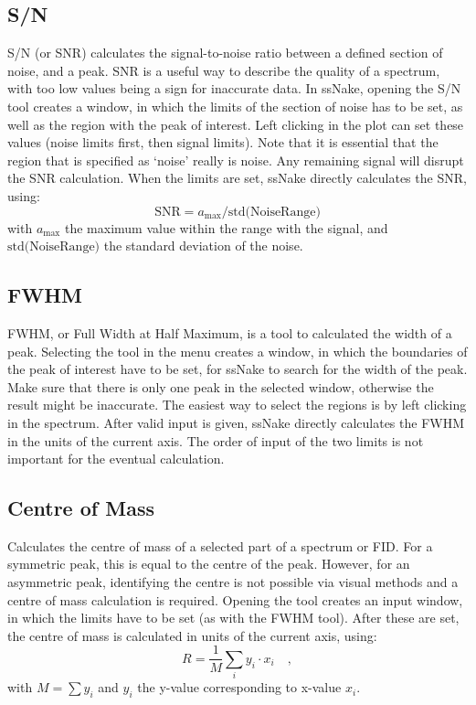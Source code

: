 \documentclass[11pt,a4paper]{article}
\begin{document}
\subsection{S/N}
S/N (or SNR) calculates the signal-to-noise ratio between a defined section of noise, and a peak. SNR is a useful way to describe the quality of a spectrum, with too low values being a sign for inaccurate data. In ssNake, opening the S/N tool creates a window, in which the limits of the section of noise has to be set, as well as the region with the peak of interest. Left clicking in the plot can set these values (noise limits first, then signal limits). Note that it is essential that the region that is specified as `noise' really is noise. Any remaining signal will disrupt the SNR calculation. When the limits are set, ssNake directly calculates the SNR, using:
\begin{equation}
\text{SNR} = a_\text{max} / \text{std(NoiseRange)}
\end{equation}
with $a_\text{max}$ the maximum value within the range with the signal, and $\text{std(NoiseRange)}$ the standard deviation of the noise.

\subsection{FWHM}
FWHM, or Full Width at Half Maximum, is a tool to calculated the width of a peak. Selecting the tool in the menu creates a window, in which the boundaries of the peak of interest have to be set, for ssNake to search for the width of the peak. Make sure that there is only one peak in the selected window, otherwise the result might be inaccurate. The easiest way to select the regions is by left clicking in the spectrum. After valid input is given, ssNake directly calculates the FWHM in the units of the current axis. The order of input of the two limits is not important for the eventual calculation.

\subsection{Centre of Mass}
Calculates the centre of mass of a selected part of a spectrum or FID. For a symmetric peak, this is equal to the centre of the peak. However, for an asymmetric peak, identifying the centre is not possible via visual methods and a centre of mass calculation is required. Opening the tool creates an input window, in which the limits have to be set (as with the FWHM tool). After these are set, the centre of mass is calculated in units of the current axis, using:
\begin{equation}
R = \frac{1}{M} \sum_i y_i \cdot x_i  \quad,
\end{equation}
with $M = \sum y_i$ and $y_i$ the y-value corresponding to x-value $x_i$.
\end{document}
